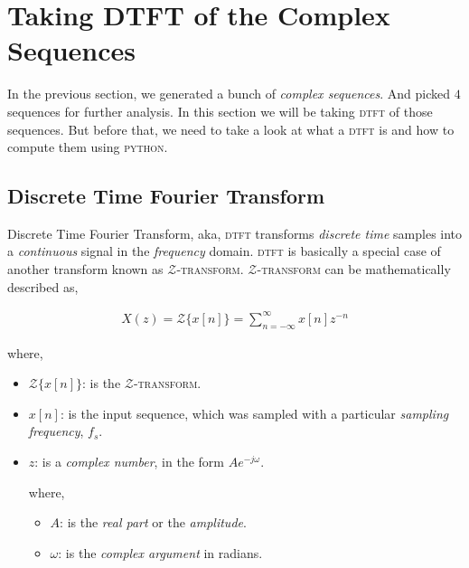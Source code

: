 \documentclass[../../course]{subfiles}
\begin{document}
\def\freqXOne{28}
\def\freqXTwo{56}
\def\freqXThree{56.1}

\def\sampFreqMuchLess{\textbf{(a):} $f_{s} = \frac{4 \times 28}{2} = 56 \si{Hz}$}
\def\sampFreqNorm{\textbf{(b):} $f_{s} = 4 \times 28 = 112 \si{Hz}$}
\def\sampFreqSligGreat{\textbf{(c):} $f_{s} = (4 \times 28) + 10 = 122 \si{Hz}$}
\def\sampFreqMuchGreat{\textbf{(d):} $f_{s} = 4 \times 28 \times 6 = 672 \si{Hz}$}

\section{Taking DTFT of the Complex Sequences} \label{sec:wrkTakingDTFTCplxSeqs}

In the previous section, we generated a bunch of \emph{complex sequences}. And
picked $4$ sequences for further analysis. In this section we will be taking
\textsc{dtft} of those sequences. But before that, we need to take a look at what
a \textsc{dtft} is and how to compute them using \textsc{python}.

\subsection{Discrete Time Fourier Transform}

Discrete Time Fourier Transform, aka, \textsc{dtft} transforms \emph{discrete time}
samples into a \emph{continuous} signal in the \emph{frequency} domain. \textsc{dtft}
is basically a special case of another transform known as $\mathcal{Z}$\textsc{-transform}.
$\mathcal{Z}$\textsc{-transform} can be mathematically described as,

\begin{align}
    X(z) = {\mathcal{Z}}\{x[n]\} = \sum_{n = - \infty}^{\infty} x[n] z^{-n}
\end{align}

where,

\begin{itemize} [label=]

    \item ${\mathcal{Z}}\{x[n]\}$: is the $\mathcal{Z}$\textsc{-transform}.
    \item $x[n]$: is the input sequence, which was sampled with a
        particular \emph{sampling frequency}, $f_{s}$.
    \item $z$: is a \emph{complex number}, in the form $A e^{-j \omega}$.

        where,

        \begin{itemize} [label=]
            \item $A$: is the \emph{real part} or the \emph{amplitude}.
            \item $\omega$: is the \emph{complex argument} in radians.
        \end{itemize}

\end{itemize}
\end{document}
